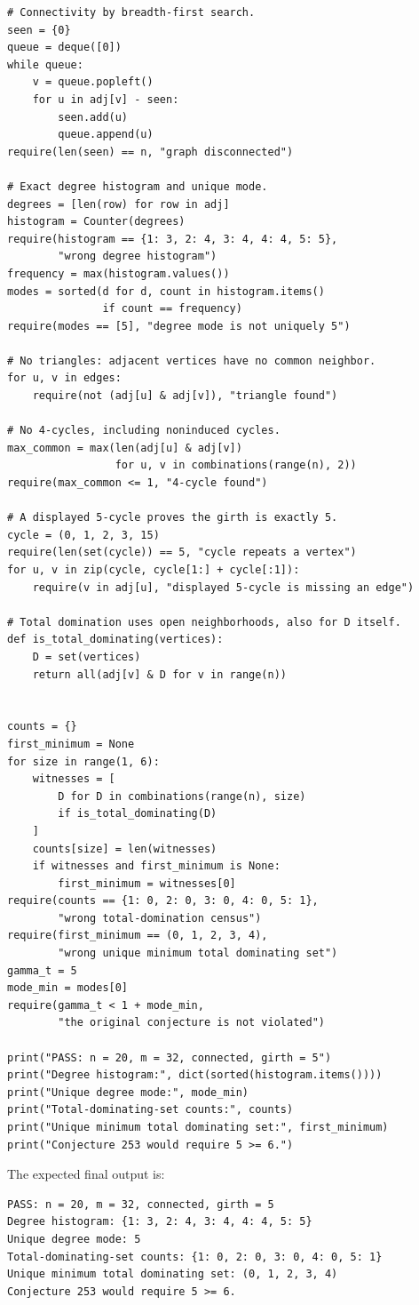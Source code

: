\documentclass[11pt,a4paper]{article}
\theoremstyle{definition}
\theoremstyle{remark}
\begin{document}
\begin{lstlisting}[style=python]
# Connectivity by breadth-first search.
seen = {0}
queue = deque([0])
while queue:
    v = queue.popleft()
    for u in adj[v] - seen:
        seen.add(u)
        queue.append(u)
require(len(seen) == n, "graph disconnected")

# Exact degree histogram and unique mode.
degrees = [len(row) for row in adj]
histogram = Counter(degrees)
require(histogram == {1: 3, 2: 4, 3: 4, 4: 4, 5: 5},
        "wrong degree histogram")
frequency = max(histogram.values())
modes = sorted(d for d, count in histogram.items()
               if count == frequency)
require(modes == [5], "degree mode is not uniquely 5")

# No triangles: adjacent vertices have no common neighbor.
for u, v in edges:
    require(not (adj[u] & adj[v]), "triangle found")

# No 4-cycles, including noninduced cycles.
max_common = max(len(adj[u] & adj[v])
                 for u, v in combinations(range(n), 2))
require(max_common <= 1, "4-cycle found")

# A displayed 5-cycle proves the girth is exactly 5.
cycle = (0, 1, 2, 3, 15)
require(len(set(cycle)) == 5, "cycle repeats a vertex")
for u, v in zip(cycle, cycle[1:] + cycle[:1]):
    require(v in adj[u], "displayed 5-cycle is missing an edge")

# Total domination uses open neighborhoods, also for D itself.
def is_total_dominating(vertices):
    D = set(vertices)
    return all(adj[v] & D for v in range(n))


counts = {}
first_minimum = None
for size in range(1, 6):
    witnesses = [
        D for D in combinations(range(n), size)
        if is_total_dominating(D)
    ]
    counts[size] = len(witnesses)
    if witnesses and first_minimum is None:
        first_minimum = witnesses[0]
require(counts == {1: 0, 2: 0, 3: 0, 4: 0, 5: 1},
        "wrong total-domination census")
require(first_minimum == (0, 1, 2, 3, 4),
        "wrong unique minimum total dominating set")
gamma_t = 5
mode_min = modes[0]
require(gamma_t < 1 + mode_min,
        "the original conjecture is not violated")

print("PASS: n = 20, m = 32, connected, girth = 5")
print("Degree histogram:", dict(sorted(histogram.items())))
print("Unique degree mode:", mode_min)
print("Total-dominating-set counts:", counts)
print("Unique minimum total dominating set:", first_minimum)
print("Conjecture 253 would require 5 >= 6.")
\end{lstlisting}

\noindent The expected final output is:
\begin{lstlisting}[basicstyle=\ttfamily\footnotesize,
frame=single,breaklines=true,columns=fullflexible]
PASS: n = 20, m = 32, connected, girth = 5
Degree histogram: {1: 3, 2: 4, 3: 4, 4: 4, 5: 5}
Unique degree mode: 5
Total-dominating-set counts: {1: 0, 2: 0, 3: 0, 4: 0, 5: 1}
Unique minimum total dominating set: (0, 1, 2, 3, 4)
Conjecture 253 would require 5 >= 6.
\end{lstlisting}
\end{document}
